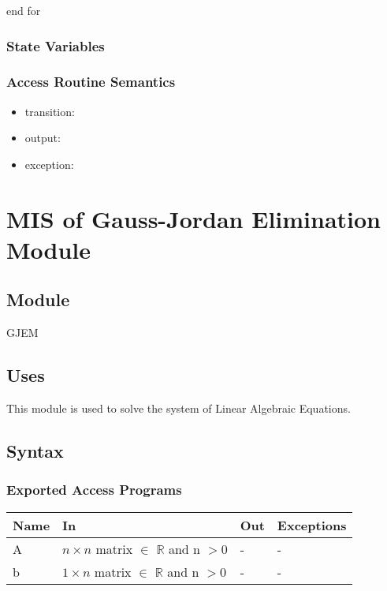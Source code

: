 \documentclass[12pt, titlepage]{article}
\begin{document}
end for

\subsubsection{State Variables}


\subsubsection{Access Routine Semantics}

\noindent %
\begin{itemize}
\item transition: %
\item output: %
\item exception: %
\end{itemize}

\section{MIS of {Gauss-Jordan Elimination  Module}} \label{gjm}

\subsection{Module}

GJEM


\subsection{Uses}
This module is used to solve the system of Linear Algebraic Equations.


\subsection{Syntax}

\subsubsection{Exported Access Programs}

\begin{center}
\begin{tabular}{p{2cm} p{4cm} p{4cm} p{2cm}}
\hline
\textbf{Name} & \textbf{In} & \textbf{Out} & \textbf{Exceptions} \\
\hline

A & $n \times n$ matrix $\in$ $\mathbb{R}$ and n $> 0$ & - & - \\
b & $1 \times n$ matrix $\in$ $\mathbb{R}$ and n $> 0$ & - & - \\
\hline
\end{tabular}
\end{center}
\end{document}
